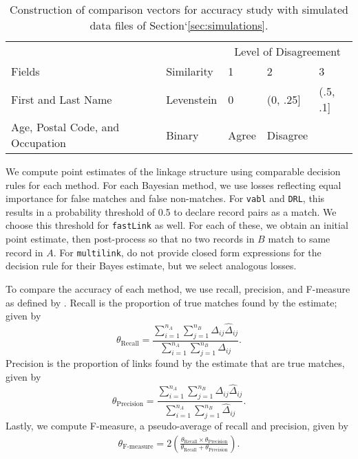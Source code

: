 \documentclass[12pt,letterpaper]{article}
\newcommand{\1}[1]{\mathbb{I}\!\left[#1\right]} %
\begin{document}
\begin{table}
	\centering
	\begin{tabular}{lllll}
		\multicolumn{2}{c}{ } & \multicolumn{3}{c}{Level of Disagreement} \\
		\cline{3-5}
		Fields & Similarity & 1 & 2 & 3 \\
		\hline
		First and Last Name & Levenstein & 0 & (0, .25] &  (.5, .1]\\
		Age, Postal Code, and Occupation & Binary & Agree & Disagree &  \\
		\hline
	\end{tabular}
	\caption{Construction of comparison vectors for accuracy study with simulated data files of Section`\ref{sec:simulations}.}
	\label{Tab:sadinle_simulation_cutoffs}
\end{table}

We compute point estimates of the linkage structure using comparable decision rules for each method. For each Bayesian method, we use losses reflecting equal importance for false matches and false non-matches. For \texttt{vabl} and \texttt{DRL}, this results in a probability threshold of 0.5 to declare record pairs as a match. We choose this threshold for \texttt{fastLink} as well. For each of these, we obtain an initial point estimate, then post-process so that no two records in $B$ match to same record in $A$. For \texttt{multilink}, \cite{aleshin2023multifile} do not provide closed form expressions for the decision rule for their Bayes estimate, but we select analogous losses. 

To compare the accuracy of each method, we use recall, precision, and F-measure as defined by \cite{christen_data_2012}. Recall is the proportion of true matches found by the estimate; given by
$$\theta_{\text{Recall}} = \frac{\sum_{i=1}^{n_A}\sum_{j=1}^{n_B} \Delta_{ij} \hat{\Delta}_{ij}}{\sum_{i=1}^{n_A}\sum_{j=1}^{n_B} \Delta_{ij}}.$$
Precision is the proportion of links found by the estimate that are true matches, given by
$$\theta_{\text{Precision}} = \frac{\sum_{i=1}^{n_A}\sum_{j=1}^{n_B}\Delta_{ij}\hat{\Delta}_{ij}}{\sum_{i=1}^{n_A}\sum_{j=1}^{n_B} \hat{\Delta}_{ij}}.$$
Lastly, we compute F-measure, a pseudo-average of recall and precision, given by 
\begin{align*}
	\theta_{\text{F-measure}} = 2 \left(\frac{\theta_{\text{Recall}} \times \theta_{\text{Precision}}}{\theta_{\text{Recall}} +  \theta_{\text{Precision}}}\right).
\end{align*}
\end{document}
